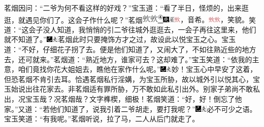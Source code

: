 茗烟因问：``二爷为何不看这样的好戏？''宝玉道：``看了半日，怪烦的，出来逛逛，就遇见你们了。这会子作什么呢？''茗烟\includegraphics[width=4mm]{../images/00025}\includegraphics[width=4mm]{../images/00025}\href{../Text/part0023_split_000.html\#lnkback_4_a}{\textsuperscript{④}}{\includegraphics[width=3mm]{../Images/00004}\includegraphics[width=3mm]{../Images/00010}\footnotesize \kaishu \includegraphics[width=
3mm]{../images/00026}，音希。\includegraphics[width=3mm]{../images/00026}\includegraphics[width=3mm]{../images/00026}，笑貌。}笑道：``这会子没人知道，我悄悄的引二爷往城外逛逛去，一会子再往这里来，他们就不知道了。''{\includegraphics[width=3mm]{../Images/00003}\includegraphics[width=3mm]{../Images/00012}\footnotesize \kaishu 茗烟此时只要掩饰方才之过，故设此以悦宝玉之心。}宝玉道：``不好，仔细花子拐了去。便是他们知道了，又闹大了，不如往熟近些的地方去，还可就来。''茗烟道：``熟近地方，谁家可去？这却难了。''宝玉笑道：``依我的主意，咱们竟找你花大姐姐去，瞧他在家作什么呢。''{\includegraphics[width=3mm]{../Images/00003}\includegraphics[width=3mm]{../Images/00012}\footnotesize \kaishu 妙！宝玉心中早安了这着，但恐茗烟不肯引去耳。恰遇茗烟私行淫媾，为宝玉所胁，故以城外引以悦其心，宝玉始说出往花家去。非茗烟适有罪所胁，万不敢如此私引出外。别家子弟尚不敢私出，况宝玉哉？况茗烟哉？文字榫楔，细极！}茗烟笑道：``好，好！倒忘了他家。''又道：``若他们知道了，说我引着二爷胡走，要打我呢？''{\includegraphics[width=3mm]{../Images/00003}\includegraphics[width=3mm]{../Images/00012}\footnotesize \kaishu 必不可少之语。}宝玉笑道：``有我呢。''茗烟听说，拉了马，二人从后门就走了。


